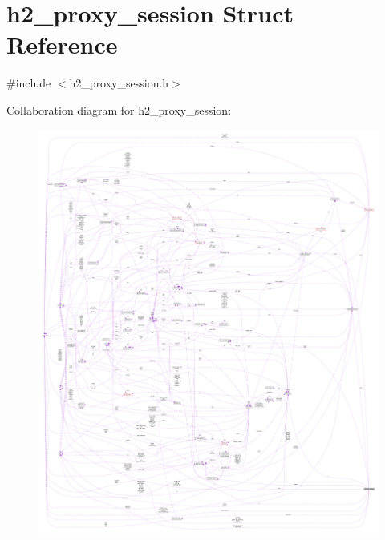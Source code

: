 \hypertarget{structh2__proxy__session}{}\section{h2\+\_\+proxy\+\_\+session Struct Reference}
\label{structh2__proxy__session}


{\ttfamily \#include $<$h2\+\_\+proxy\+\_\+session.\+h$>$}



Collaboration diagram for h2\+\_\+proxy\+\_\+session\+:
\nopagebreak
\begin{figure}[H]
\begin{center}
\leavevmode
\includegraphics[width=350pt]{structh2__proxy__session__coll__graph}
\end{center}
\end{figure}
